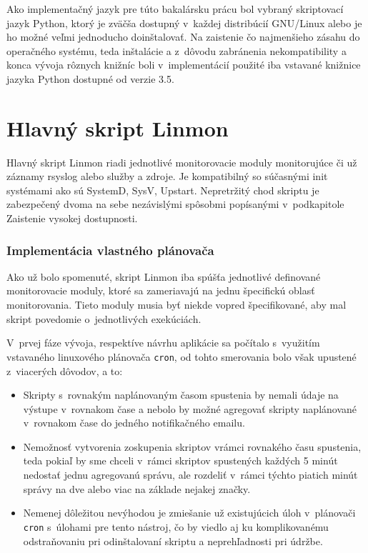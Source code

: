 Ako implementačný jazyk pre túto bakalársku prácu bol vybraný skriptovací jazyk Python, ktorý je zväčša dostupný v~každej distribúcií GNU/Linux alebo je ho možné veľmi jednoducho doinštalovať. Na zaistenie čo najmenšieho zásahu do operačného systému, teda inštalácie a z~dôvodu zabránenia nekompatibility a konca vývoja rôznych knižníc boli v~implementácií použité iba vstavané knižnice jazyka Python dostupné od verzie 3.5.

\section{Hlavný skript Linmon}

Hlavný skript Linmon riadi jednotlivé monitorovacie moduly monitorujúce či už záznamy rsyslog alebo služby a zdroje. Je kompatibilný so súčasnými init systémami ako sú SystemD, SysV, Upstart. Nepretržitý chod skriptu je zabezpečený dvoma na sebe nezávislými spôsobmi popísanými v~podkapitole Zaistenie vysokej dostupnosti.  

\subsubsection*{Implementácia vlastného plánovača}
Ako už bolo spomenuté, skript Linmon iba spúšťa jednotlivé definované monitorovacie moduly, ktoré sa zameriavajú na jednu špecifickú oblasť monitorovania. Tieto moduly musia byť niekde vopred špecifikované, aby mal skript povedomie o~jednotlivých exekúciách.

\noindent
V~prvej fáze vývoja, respektíve návrhu aplikácie sa počítalo s~využitím vstavaného \mbox{linuxového} plánovača \texttt{cron}, od tohto smerovania bolo však upustené z~viacerých dôvodov, a to: 

\begin{itemize}
	\item  Skripty s~rovnakým naplánovaným časom spustenia by nemali údaje na výstupe v~rovnakom čase a nebolo by možné agregovať skripty naplánované v~rovnakom čase do jedného notifikačného emailu.
	
	\item Nemožnosť vytvorenia zoskupenia skriptov vrámci rovnakého času spustenia, teda pokiaľ by sme chceli v~rámci skriptov spustených každých 5 minút nedostať jednu agregovanú správu, ale rozdeliť v~rámci týchto piatich minút správy na dve alebo viac na základe nejakej značky.
	
	\item Nemenej dôležitou nevýhodou je zmiešanie už existujúcich úloh v~plánovači \texttt{cron} s~úlohami pre tento nástroj, čo by viedlo aj ku komplikovanému odstraňovaniu pri odinštalovaní skriptu a neprehľadnosti pri údržbe.
\end{itemize}

